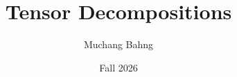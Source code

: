 \documentclass{article}
\begin{document}
\title{Tensor Decompositions}
\author{Muchang Bahng}
\date{Fall 2026}

\maketitle
\tableofcontents
\pagebreak





\end{document}
